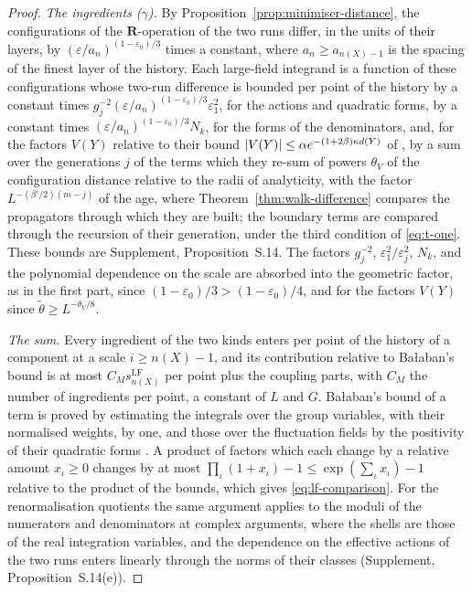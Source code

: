 \documentclass[11pt]{preprint}
\DeclarePairedDelimiter{\abs}{\lvert}{\rvert}
\numberwithin{equation}{section}
\theoremstyle{definition}
\theoremstyle{remark}
\theoremstyle{plain}
\begin{document}
\begin{proof}
\emph{The ingredients ($\gamma$).} By Proposition~\ref{prop:minimiser-distance}, the configurations of the $\mathbf R$-operation of the two runs differ, in the units of their layers, by $(\varepsilon/a_n)^{(1-\varepsilon_0)/3}$ times a constant, where $a_n \geq a_{n(X)-1}$ is the spacing of the finest layer of the history. Each large-field integrand is a function of these configurations whose two-run difference is bounded per point of the history by a constant times $g_j^{-2}(\varepsilon/a_n)^{(1-\varepsilon_0)/3}\varepsilon_1^2$, for the actions and quadratic forms, by a constant times $(\varepsilon/a_n)^{(1-\varepsilon_0)/3}N_k$, for the forms of the denominators, and, for the factors $V(Y)$ relative to their bound $\abs{V(Y)} \leq \alpha e^{-(1+2\beta)\kappa d(Y)}$ of \cite[(1.68), p.~377]{BalabanLFR2}, by a sum over the generations $j$ of the terms which they re-sum of powers $\theta_V$ of the configuration distance relative to the radii of analyticity, with the factor $L^{-(\beta'/2)(m-j)}$ of the age, where Theorem~\ref{thm:walk-difference} compares the propagators through which they are built; the boundary terms are compared through the recursion of their generation, under the third condition of \eqref{eq:t-one}. These bounds are Supplement, Proposition~S.14. The factors $g_j^{-2}$, $\varepsilon_1^2/\varepsilon_j^2$, $N_k$, and the polynomial dependence on the scale are absorbed into the geometric factor, as in the first part, since $(1 - \varepsilon_0)/3 > (1 - \varepsilon_0)/4$, and for the factors $V(Y)$ since $\tilde\theta \geq L^{-\theta_V/8}$.

\emph{The sum.} Every ingredient of the two kinds enters per point of the history of a component at a scale $i \geq n(X) - 1$, and its contribution relative to Ba{\l}aban's bound is at most $C_Ms^{\mathrm{LF}}_{n(X)}$ per point plus the coupling parts, with $C_M$ the number of ingredients per point, a constant of $L$ and $G$. Ba{\l}aban's bound of a term is proved by estimating the integrals over the group variables, with their normalised weights, by one, and those over the fluctuation fields by the positivity of their quadratic forms \cite[p.~383]{BalabanLFR2}. A product of factors which each change by a relative amount $x_\iota \geq 0$ changes by at most $\prod_\iota(1 + x_\iota) - 1 \leq \exp(\sum_\iota x_\iota) - 1$ relative to the product of the bounds, which gives \eqref{eq:lf-comparison}. For the renormalisation quotients the same argument applies to the moduli of the numerators and denominators at complex arguments, where the shells are those of the real integration variables, and the dependence on the effective actions of the two runs enters linearly through the norms of their classes (Supplement, Proposition~S.14(e)).
\end{proof}
\end{document}
